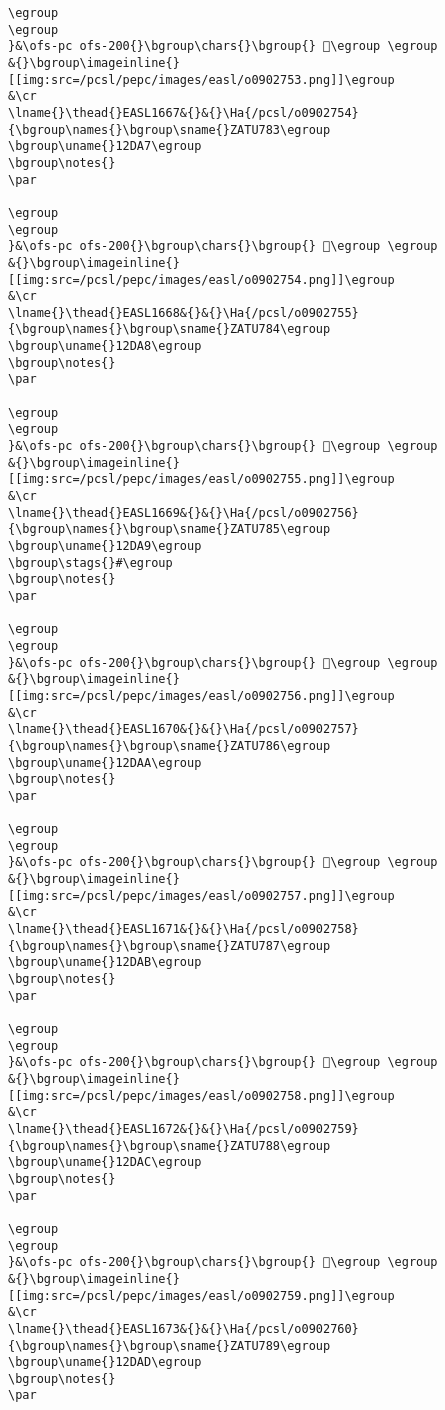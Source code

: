 \begin{verbatim}
\egroup
\egroup
}&\ofs-pc ofs-200{}\bgroup\chars{}\bgroup{} 𒶦\egroup \egroup
&{}\bgroup\imageinline{}[[img:src=/pcsl/pepc/images/easl/o0902753.png]]\egroup
&\cr
\lname{}\thead{}EASL1667&{}&{}\Ha{/pcsl/o0902754}{\bgroup\names{}\bgroup\sname{}ZATU783\egroup
\bgroup\uname{}12DA7\egroup
\bgroup\notes{}
\par 

\egroup
\egroup
}&\ofs-pc ofs-200{}\bgroup\chars{}\bgroup{} 𒶧\egroup \egroup
&{}\bgroup\imageinline{}[[img:src=/pcsl/pepc/images/easl/o0902754.png]]\egroup
&\cr
\lname{}\thead{}EASL1668&{}&{}\Ha{/pcsl/o0902755}{\bgroup\names{}\bgroup\sname{}ZATU784\egroup
\bgroup\uname{}12DA8\egroup
\bgroup\notes{}
\par 

\egroup
\egroup
}&\ofs-pc ofs-200{}\bgroup\chars{}\bgroup{} 𒶨\egroup \egroup
&{}\bgroup\imageinline{}[[img:src=/pcsl/pepc/images/easl/o0902755.png]]\egroup
&\cr
\lname{}\thead{}EASL1669&{}&{}\Ha{/pcsl/o0902756}{\bgroup\names{}\bgroup\sname{}ZATU785\egroup
\bgroup\uname{}12DA9\egroup
\bgroup\stags{}#\egroup
\bgroup\notes{}
\par 

\egroup
\egroup
}&\ofs-pc ofs-200{}\bgroup\chars{}\bgroup{} 𒶩\egroup \egroup
&{}\bgroup\imageinline{}[[img:src=/pcsl/pepc/images/easl/o0902756.png]]\egroup
&\cr
\lname{}\thead{}EASL1670&{}&{}\Ha{/pcsl/o0902757}{\bgroup\names{}\bgroup\sname{}ZATU786\egroup
\bgroup\uname{}12DAA\egroup
\bgroup\notes{}
\par 

\egroup
\egroup
}&\ofs-pc ofs-200{}\bgroup\chars{}\bgroup{} 𒶪\egroup \egroup
&{}\bgroup\imageinline{}[[img:src=/pcsl/pepc/images/easl/o0902757.png]]\egroup
&\cr
\lname{}\thead{}EASL1671&{}&{}\Ha{/pcsl/o0902758}{\bgroup\names{}\bgroup\sname{}ZATU787\egroup
\bgroup\uname{}12DAB\egroup
\bgroup\notes{}
\par 

\egroup
\egroup
}&\ofs-pc ofs-200{}\bgroup\chars{}\bgroup{} 𒶫\egroup \egroup
&{}\bgroup\imageinline{}[[img:src=/pcsl/pepc/images/easl/o0902758.png]]\egroup
&\cr
\lname{}\thead{}EASL1672&{}&{}\Ha{/pcsl/o0902759}{\bgroup\names{}\bgroup\sname{}ZATU788\egroup
\bgroup\uname{}12DAC\egroup
\bgroup\notes{}
\par 

\egroup
\egroup
}&\ofs-pc ofs-200{}\bgroup\chars{}\bgroup{} 𒶬\egroup \egroup
&{}\bgroup\imageinline{}[[img:src=/pcsl/pepc/images/easl/o0902759.png]]\egroup
&\cr
\lname{}\thead{}EASL1673&{}&{}\Ha{/pcsl/o0902760}{\bgroup\names{}\bgroup\sname{}ZATU789\egroup
\bgroup\uname{}12DAD\egroup
\bgroup\notes{}
\par 


\end{verbatim}
